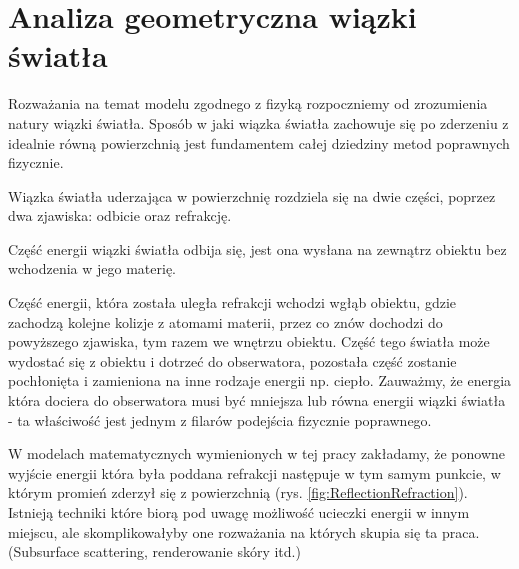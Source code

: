 \documentclass[../main.tex]{subfiles}
\begin{document}
\section{Analiza geometryczna wiązki światła}

Rozważania na temat modelu zgodnego z fizyką rozpoczniemy od zrozumienia natury
wiązki światła. Sposób w jaki wiązka światła zachowuje się po zderzeniu z
idealnie równą powierzchnią jest fundamentem całej dziedziny metod poprawnych
fizycznie.

Wiązka światła uderzająca w powierzchnię rozdziela się na dwie części, poprzez
dwa zjawiska: odbicie oraz refrakcję.

Część energii wiązki światła odbija się, jest ona wysłana na zewnątrz obiektu
bez wchodzenia w jego materię.

Część energii, która została uległa refrakcji wchodzi wgłąb obiektu, gdzie
zachodzą kolejne kolizje z atomami materii, przez co znów dochodzi do
powyższego zjawiska, tym razem we wnętrzu obiektu. Część tego światła może
wydostać się z obiektu i dotrzeć do obserwatora, pozostała część zostanie
pochłonięta i zamieniona na inne rodzaje energii np. ciepło. Zauważmy, że
energia która dociera do obserwatora musi być mniejsza lub równa energii wiązki
światła - ta właściwość jest jednym z filarów podejścia fizycznie poprawnego.

W modelach matematycznych wymienionych w tej pracy zakładamy, że ponowne
wyjście energii która była poddana refrakcji następuje w tym samym punkcie, w
którym promień zderzył się z powierzchnią (rys.
\ref{fig:ReflectionRefraction}). Istnieją techniki które biorą pod uwagę
możliwość ucieczki energii w innym miejscu, ale skomplikowałyby one rozważania
na których skupia się ta praca.  (Subsurface scattering, renderowanie skóry
itd.)
\end{document}
